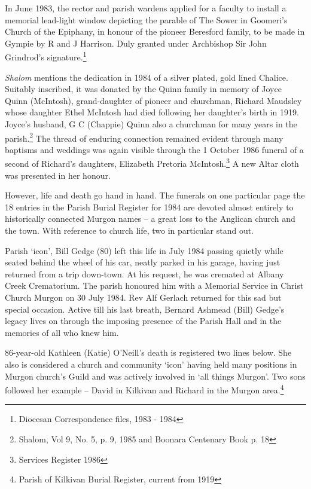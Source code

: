 In June 1983, the rector and parish wardens applied for a faculty to install a memorial lead-light window depicting the parable of The Sower in Goomeri's Church of the Epiphany, in honour of the pioneer Beresford family, to be made in Gympie by R and J Harrison. Duly granted under Archbishop Sir John Grindrod's signature.\footnote{Diocesan Correspondence files, 1983 - 1984}


\emph{Shalom} mentions the dedication in 1984 of a silver plated, gold lined Chalice. Suitably inscribed, it was donated by the Quinn family in memory of Joyce Quinn (McIntosh), grand-daughter of pioneer and churchman, Richard Maudsley whose daughter Ethel McIntosh had died following her daughter's birth in 1919. Joyce's husband, G C (Chappie) Quinn also a churchman for many years in the parish.\footnote{Shalom, Vol 9, No. 5, p. 9, 1985 and Boonara Centenary Book p. 18} The thread of enduring connection remained evident through many baptisms and weddings was again visible through the 1 October 1986 funeral of a second of Richard's daughters, Elizabeth Pretoria McIntosh.\footnote{Services Register 1986} A new Altar cloth was presented in her honour.


However, life and death go hand in hand. The funerals on one particular page the 18 entries in the Parish Burial Register for 1984 are devoted almost entirely to historically connected Murgon names -- a great loss to the Anglican church and the town. With reference to church life, two in particular stand out.



Parish `icon', Bill Gedge (80) left this life in July 1984 passing quietly while seated behind the wheel of his car, neatly parked in his garage, having just returned from a trip down-town. At his request, he was cremated at Albany Creek Crematorium. The parish honoured him with a Memorial Service in Christ Church Murgon on 30 July 1984. Rev Alf Gerlach returned for this sad but special occasion. Active till his last breath, Bernard Ashmead (Bill) Gedge's legacy lives on through the imposing presence of the Parish Hall and in the memories of all who knew him.



86-year-old Kathleen (Katie) O'Neill's death is registered two lines below. She also is considered a church and community `icon' having held many positions in Murgon church's Guild and was actively involved in `all things Murgon'. Two sons followed her example -- David in Kilkivan and Richard in the Murgon area.\footnote{Parish of Kilkivan Burial Register, current from 1919}


